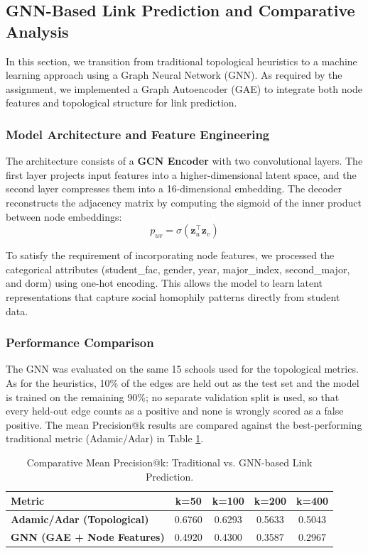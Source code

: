 \documentclass[12pt]{article}
\begin{document}
\subsection*{GNN-Based Link Prediction and Comparative Analysis}

In this section, we transition from traditional topological heuristics to a machine learning approach using a Graph Neural Network (GNN). As required by the assignment, we implemented a Graph Autoencoder (GAE) to integrate both node features and topological structure for link prediction.

\subsubsection*{Model Architecture and Feature Engineering}

The architecture consists of a \textbf{GCN Encoder} with two convolutional layers. The first layer projects input features into a higher-dimensional latent space, and the second layer compresses them into a 16-dimensional embedding. The decoder reconstructs the adjacency matrix by computing the sigmoid of the inner product between node embeddings:
$$p_{uv} = \sigma(\mathbf{z}_u^\top \mathbf{z}_v)$$

To satisfy the requirement of incorporating node features, we processed the categorical attributes (student\_fac, gender, year, major\_index, second\_major, and dorm) using one-hot encoding. This allows the model to learn latent representations that capture social homophily patterns directly from student data.

\subsubsection*{Performance Comparison}

The GNN was evaluated on the same 15 schools used for the topological metrics. As for the heuristics, 10\% of the edges are held out as the test set and the model is trained on the remaining 90\%; no separate validation split is used, so that every held-out edge counts as a positive and none is wrongly scored as a false positive. The mean Precision@k results are compared against the best-performing traditional metric (Adamic/Adar) in Table \ref{tab:gnn_comparison}.

\begin{table}[ht!]
    \centering
    \begin{tabular}{|l|c|c|c|c|}
        \hline
        \textbf{Metric}                    & \textbf{k=50} & \textbf{k=100} & \textbf{k=200} & \textbf{k=400} \\ \hline
        \textbf{Adamic/Adar (Topological)} & 0.6760        & 0.6293         & 0.5633         & 0.5043         \\ \hline
        \textbf{GNN (GAE + Node Features)} & 0.4920        & 0.4300         & 0.3587         & 0.2967         \\ \hline
    \end{tabular}
    \caption{Comparative Mean Precision@k: Traditional vs. GNN-based Link Prediction.}
    \label{tab:gnn_comparison}
\end{table}
\end{document}
